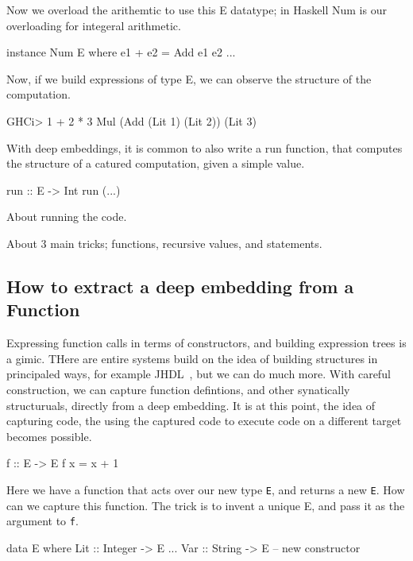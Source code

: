 \documentclass[11pt]{article}
\begin{document}
Now we overload the arithemtic to use this E datatype;
in Haskell Num is our overloading for integeral arithmetic.

\begin{Code}
instance Num E where
  e1 + e2 = Add e1 e2
  ...
  
\end{Code}

Now, if we build expressions of type E, we can
observe the structure of the computation.
\begin{SemiCode}
GHCi> 1 + 2 * 3
Mul (Add (Lit 1) (Lit 2)) (Lit 3)
\end{SemiCode}

With deep embeddings, it is common to also
write a run function, that computes the structure
of a catured computation, given a simple value.
\begin{Code}
run :: E -> Int
run (...)
\end{Code}

About running the code.

About 3 main tricks; functions, recursive values, and statements.

\subsection{How to extract a deep embedding from a Function}

Expressing function calls in terms of constructors,  and
building expression trees is a gimic. THere are entire
systems build on the idea of building structures 
in principaled ways, for example JHDL~\cite{..}, but
we can do much more. With careful construction,
we can capture function defintions,
and other synatically structuruals,
directly from a deep embedding. It is at this
point, the idea of capturing code,
the using the captured code to execute code
on a different target becomes possible.

\begin{Code}

f :: E -> E
f x = x + 1
        
\end{Code}

Here we have a function that acts over our new type
\verb|E|, and returns a new \verb|E|. How can we capture
this function.
The trick is to invent a unique E, and pass it as the argument
to \verb|f|.

\begin{Code}
data E where
  Lit :: Integer -> E
  ...
  Var :: String -> E    -- new constructor
\end{Code}        
\end{document}
